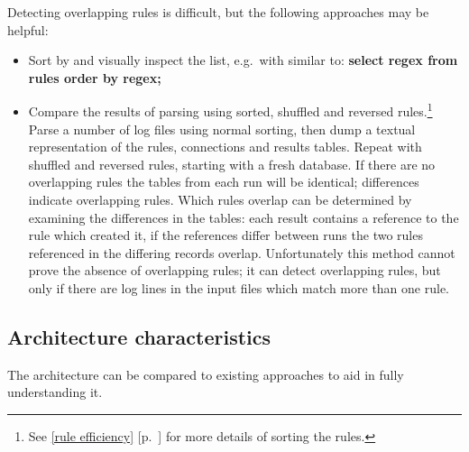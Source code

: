 \documentclass[draft]{svmult}
\newcommand{\refwithpage}[1]{%
    \empty{}\ref{#1} [p.~\pageref{#1}]%
}
\newcommand{\sectionref}[1]{%
    \textsection{}\refwithpage{#1}%
}
\begin{document}
Detecting overlapping rules is difficult, but the following approaches may
be helpful:

\begin{itemize}

    \item Sort by \regex{} and visually inspect the list, e.g.\ with \SQL{}
        similar to: \textbf{select regex from rules order by regex;}

    \item Compare the results of parsing using sorted, shuffled and
        reversed rules.\footnote{See \sectionref{rule efficiency} for more
        details of sorting the rules.}  Parse a number of log files using
        normal sorting, then dump a textual representation of the rules,
        connections and results tables.  Repeat with shuffled and reversed
        rules, starting with a fresh database.  If there are no overlapping
        rules the tables from each run will be identical; differences
        indicate overlapping rules.  Which rules overlap can be determined
        by examining the differences in the tables: each result contains a
        reference to the rule which created it, if the references differ
        between runs the two rules referenced in the differing records
        overlap.  Unfortunately this method cannot prove the absence of
        overlapping rules; it can detect overlapping rules, but only if
        there are log lines in the input files which match more than one
        rule.

\end{itemize}




\subsection{Architecture characteristics}

\label{Architecture characteristics}

The architecture can be compared to existing approaches to aid in fully
understanding it.
\end{document}
